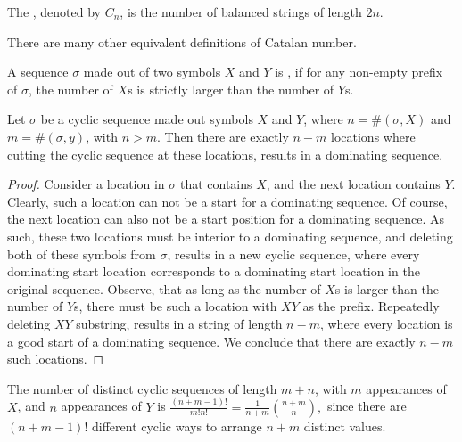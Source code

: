 \begin{defn}
    The , denoted by $C_n$, is the number of
    balanced strings of length $2n$.
\end{defn}

There are many other equivalent definitions of Catalan number.

\begin{defn}
    A sequence $\sigma$ made out of two symbols $X$ and $Y$ is
    , if for any non-empty prefix of $\sigma$, the
    number of $X$s is strictly larger than the number of $Y$s.
\end{defn}

\begin{lemma}
    Let $\sigma$ be a cyclic sequence made out symbols $X$ and $Y$,
    where $n = \#(\sigma,X)$ and
    $m = \#(\sigma,y)$, with $n > m$. Then there are exactly $n-m$
    locations where cutting the cyclic sequence at these locations,
    results in a dominating sequence.
\end{lemma}
\begin{proof}
    Consider a location in $\sigma$ that contains $X$, and the next
    location contains $Y$. Clearly, such a location can not be a start
    for a dominating sequence. Of course, the next location can also
    not be a start position for a dominating sequence. As such, these
    two locations must be interior to a dominating sequence, and
    deleting both of these symbols from $\sigma$, results in a new
    cyclic sequence, where every dominating start location corresponds
    to a dominating start location in the original sequence. Observe,
    that as long as the number of $X$s is larger than the number of
    $Y$s, there must be such a location with $XY$ as the
    prefix. Repeatedly deleting $XY$ substring, results in a string of
    length $n-m$, where every location is a good start of a dominating
    sequence. We conclude that there are exactly $n-m$ such locations.
\end{proof}

\begin{observation}
    The number of distinct cyclic sequences of length $m+n$, with $m$
    appearances of $X$, and $n$ appearances of $Y$ is
    \begin{math}
        \frac{(n+m-1)!}{m! n!} = \frac{1}{n +m}\binom{n + m}{n},
    \end{math}
    since there are $(n+m-1)!$ different cyclic ways to arrange $n+m$
    distinct values.
\end{observation}

